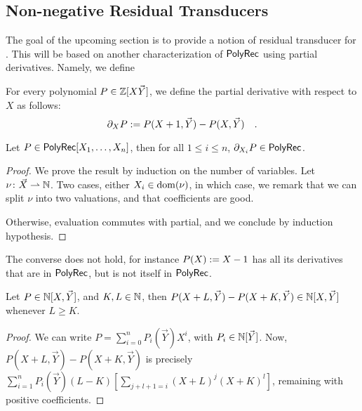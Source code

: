 \subsection{Non-negative Residual Transducers}

The goal of the upcoming section is to provide a notion of residual transducer
for  .
This will be based on another characterization of $\mathsf{PolyRec}$
using partial derivatives. Namely, we define

\begin{definition}
    For every polynomial $P \in \mathbb{Z}[X \vec{Y}]$, we define 
    the partial derivative with respect to $X$ as follows:
    \begin{equation*}
        \partial_X P \mathrel{:=} P(X + 1, \vec{Y}) - P(X, \vec{Y}) \quad .
    \end{equation*}
\end{definition}

\begin{fact}
    Let $P \in \mathsf{PolyRec}[X_1, \dots, X_n]$, then
    for all $1 \leq i \leq n$,
    $\partial_{X_i} P \in \mathsf{PolyRec}$.
\end{fact}
\begin{proof}
    We prove the result by induction on the number of variables.
    Let $\nu \colon \vec{X} \rightharpoonup \mathbb{N}$.
    Two cases, either $X_i \in \operatorname{dom}(\nu)$,
    in which case, we remark that
    we can split $\nu$ into two valuations,
    and that coefficients are good.

    Otherwise, evaluation commutes with partial,
    and we conclude by induction hypothesis.
\end{proof}

\begin{remark}
    The converse does not hold,
    for instance $P(X) \mathrel{:=} X - 1$ has all its derivatives
    that are in $\mathsf{PolyRec}$, but is not itself in $\mathsf{PolyRec}$.
\end{remark}

\begin{fact}
    Let $P \in \mathbb{N}[X,\vec{Y}]$, and $K,L \in \mathbb{N}$,
    then $P(X+L, \vec{Y}) - P(X+K,\vec{Y}) \in \mathbb{N}[X, \vec{Y}]$
    whenever $L \geq K$.
\end{fact}
\begin{proof}
    We can write
    $P = \sum_{i = 0}^n P_i(\vec{Y}) X^i$, with $P_i \in \mathbb{N}[\vec{Y}]$.
    Now,
    $P(X+L,\vec{Y}) - P(X+K,\vec{Y})$
    is precisely
    $\sum_{i = 1}^n P_i(\vec{Y}) (L-K) \left[ \sum_{j + l + 1= i} (X+L)^j (X+K)^l \right]$,
    remaining with positive coefficients.
\end{proof}

